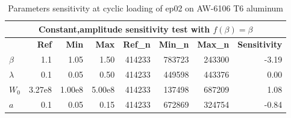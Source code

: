 \documentclass[3p,times,number,review]{elsarticle}
\begin{document}
\begin{table}[!h]
	\centering
	\begin{tabular}{lrrrrrrr}
		\hline
		\multicolumn{8}{c}{\textbf{Constant,amplitude sensitivity test with $f(\beta)=\beta$}}                                                                                                                                                                                                                                           \\ \hline
		& \multicolumn{1}{r}{\textbf{Ref}} & \multicolumn{1}{r}{\textbf{Min}} & \multicolumn{1}{r}{\textbf{Max}} & \multicolumn{1}{r}{\textbf{Ref\_n}} & \multicolumn{1}{r}{\textbf{Min\_n}} & \multicolumn{1}{r}{\textbf{Max\_n}} & \multicolumn{1}{r}{\textbf{Sensitivity}} \\ \hline
		\textbf{$\beta$}   & 1.1                                          & 1.05                             & 1.50                             & 414233                                     & 
		783723 	                              & 243300 
		&-3.19 
		
		\\
		\textbf{$\lambda$} & 0.1                                          & 0.05                             & 0.50                             & 414233                                    & 449598 
		& 443376 
		& 0.00                                    \\
		\textbf{$W_0$}     & 3.27e8                                     & 1.00e8                         & 5.00e8                         & 414233                                     & 137498 
		& 687209 
		& 1.08                                    \\
		\textbf{$a$}       & 0.1                                          & 0.05                             & 0.15                             & 414233                                  & 672869 
		& 324754 
		& -0.84                                   \\ \hline
	\end{tabular}
	\caption{Parameters sensitivity at cyclic loading of ep02 on AW-6106 T6 aluminum}
	\label{tab.sensitivity_const1}
\end{table}
\end{document}
